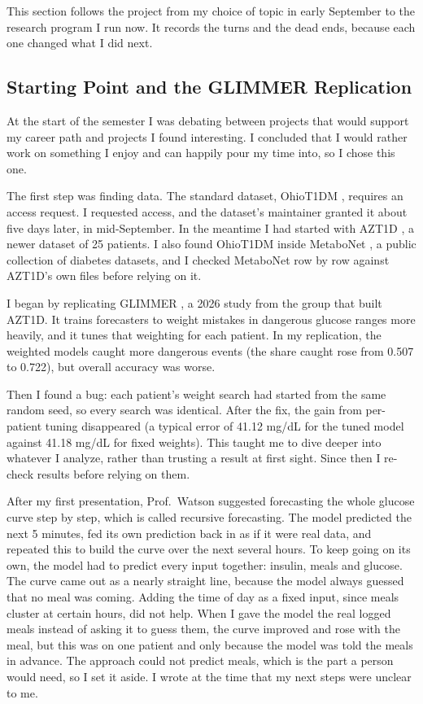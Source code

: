 This section follows the project from my choice of topic in early September to the research program I run now. It records the turns and the dead ends, because each one changed what I did next.

\subsection{Starting Point and the GLIMMER Replication}

At the start of the semester I was debating between projects that would support my career path and projects I found interesting. I concluded that I would rather work on something I enjoy and can happily pour my time into, so I chose this one.

The first step was finding data. The standard dataset, OhioT1DM \parencite{marling2020ohio}, requires an access request. I requested access, and the dataset's maintainer granted it about five days later, in mid-September. In the meantime I had started with AZT1D \parencite{azt1d2025}, a newer dataset of 25 patients. I also found OhioT1DM inside MetaboNet \parencite{metabonet2026}, a public collection of diabetes datasets, and I checked MetaboNet row by row against AZT1D's own files before relying on it.

I began by replicating GLIMMER \parencite{glimmer2026}, a 2026 study from the group that built AZT1D. It trains forecasters to weight mistakes in dangerous glucose ranges more heavily, and it tunes that weighting for each patient. In my replication, the weighted models caught more dangerous events (the share caught rose from 0.507 to 0.722), but overall accuracy was worse.

Then I found a bug: each patient's weight search had started from the same random seed, so every search was identical. After the fix, the gain from per-patient tuning disappeared (a typical error of 41.12 mg/dL for the tuned model against 41.18 mg/dL for fixed weights). This taught me to dive deeper into whatever I analyze, rather than trusting a result at first sight. Since then I re-check results before relying on them.

After my first presentation, Prof.\ Watson suggested forecasting the whole glucose curve step by step, which is called recursive forecasting. The model predicted the next 5 minutes, fed its own prediction back in as if it were real data, and repeated this to build the curve over the next several hours. To keep going on its own, the model had to predict every input together: insulin, meals and glucose. The curve came out as a nearly straight line, because the model always guessed that no meal was coming. Adding the time of day as a fixed input, since meals cluster at certain hours, did not help. When I gave the model the real logged meals instead of asking it to guess them, the curve improved and rose with the meal, but this was on one patient and only because the model was told the meals in advance. The approach could not predict meals, which is the part a person would need, so I set it aside. I wrote at the time that my next steps were unclear to me.

